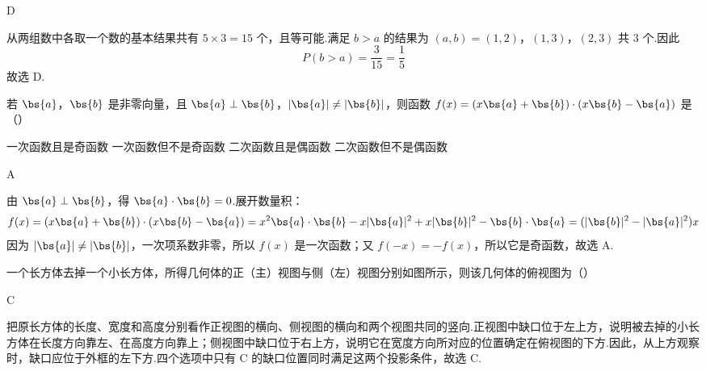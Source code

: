 \begin{answer}
D
\end{answer}

\begin{solution}
从两组数中各取一个数的基本结果共有 \(5\times3=15\) 个，且等可能.满足 \(b>a\) 的结果为
\((a,b)=(1,2)\)，\((1,3)\)，\((2,3)\)
共 \(3\) 个.因此
\[
P(b>a)=\frac{3}{15}=\frac{1}{5}
\]
故选 D.
\end{solution}

\begin{problem}
若 \(\bs{a}\)，\(\bs{b}\) 是非零向量，且 \(\bs{a} \perp \bs{b}\)，\(|\bs{a}| \neq |\bs{b}|\)，则函数 \(f(x) = (x\bs{a} + \bs{b}) \cdot (x\bs{b} - \bs{a})\) 是（\quad）

\choices
    {一次函数且是奇函数}
    {一次函数但不是奇函数}
    {二次函数且是偶函数}
    {二次函数但不是偶函数}
\end{problem}

\begin{answer}
A
\end{answer}

\begin{solution}
由 \(\bs{a}\perp\bs{b}\)，得 \(\bs{a}\cdot\bs{b}=0\).展开数量积：
\[
f(x)=(x\bs{a}+\bs{b})\cdot(x\bs{b}-\bs{a})
=x^2\bs{a}\cdot\bs{b}-x|\bs{a}|^2+x|\bs{b}|^2-\bs{b}\cdot\bs{a}
=(|\bs{b}|^2-|\bs{a}|^2)x
\]
因为 \(|\bs{a}|\ne|\bs{b}|\)，一次项系数非零，所以 \(f(x)\) 是一次函数；又 \(f(-x)=-f(x)\)，所以它是奇函数，故选 A.
\end{solution}

\begin{problem}
一个长方体去掉一个小长方体，所得几何体的正（主）视图与侧（左）视图分别如图所示，则该几何体的俯视图为（\quad）


\choices
    {}
    {}
    {}
    {}
\end{problem}

\begin{answer}
C
\end{answer}

\begin{solution}
把原长方体的长度、宽度和高度分别看作正视图的横向、侧视图的横向和两个视图共同的竖向.正视图中缺口位于左上方，说明被去掉的小长方体在长度方向靠左、在高度方向靠上；侧视图中缺口位于右上方，说明它在宽度方向所对应的位置确定在俯视图的下方.因此，从上方观察时，缺口应位于外框的左下方.四个选项中只有 C 的缺口位置同时满足这两个投影条件，故选 C.
\end{solution}

